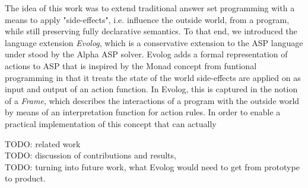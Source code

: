 The idea of this work was to extend traditional answer set programming with a means to apply "side-effects", i.e. influence the outside world, from a program, while still preserving fully declarative semantics. To that end, we introduced the language extension \emph{Evolog}, which is a conservative extension to the ASP language under stood by the Alpha ASP solver. Evolog adds a formal representation of actions to ASP that is inspired by the Monad concept from funtional programming in that it treats the state of the world side-effects are applied on as input and output of an action function. In Evolog, this is captured in the notion of a \emph{Frame}, which describes the interactions of a program with the outside world by means of an interpretation function for action rules. In order to enable a practical implementation of this concept that can actually 

TODO: related work\\
TODO: discussion of contributions and results,\\
TODO: turning into future work, what Evolog would need to get from prototype to product.